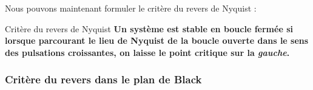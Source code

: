 Nous pouvons maintenant formuler le critère du revers de Nyquist :

\begin{criteria}{Critère du revers de Nyquist}
\textbf{Un système est stable en boucle fermée si lorsque parcourant 
        le lieu de Nyquist de la boucle ouverte dans le sens des 
        pulsations croissantes, on laisse le point critique sur la \emph{gauche}.}
\end{criteria}

\newpage
\subsubsection{Critère du revers dans le plan de Black}

\acpl

